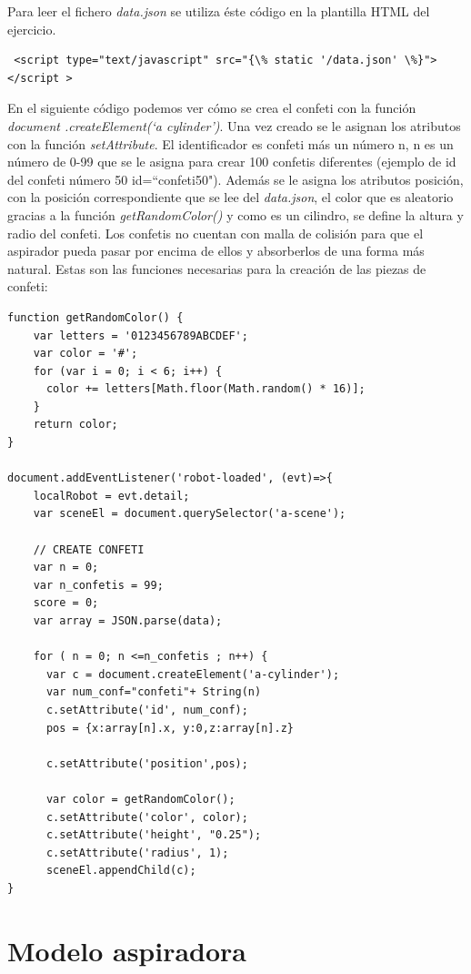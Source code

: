 Para leer el fichero \textit{data.json} se utiliza éste código en la plantilla HTML del ejercicio.
\begin{lstlisting}
 <script type="text/javascript" src="{\% static '/data.json' \%}"></script > 
 \end{lstlisting}


En el siguiente código podemos ver cómo se crea el confeti con la función \textit{document .createElement(`a\- cylinder')}. Una vez creado se le asignan los atributos con la función  \textit{setAttribute}.  El identificador es confeti más un número  n, n es un número de 0-99 que se le asigna para crear 100 confetis diferentes (ejemplo de id del confeti número 50   id=``confeti50"). Además se le asigna los atributos posición, con la posición correspondiente que se lee del \textit{data.json}, el color que es aleatorio gracias a la función \textit{getRandomColor()} y  como es un cilindro, se define la altura y radio del confeti.
Los confetis no cuentan con malla de colisión para que el aspirador pueda pasar por encima de ellos y absorberlos de una forma más natural.
Estas son las funciones necesarias para la creación de las piezas de confeti: 
\begin{lstlisting}
function getRandomColor() {
    var letters = '0123456789ABCDEF';
    var color = '#';
    for (var i = 0; i < 6; i++) {
      color += letters[Math.floor(Math.random() * 16)];
    }
    return color;
}

document.addEventListener('robot-loaded', (evt)=>{
    localRobot = evt.detail;
    var sceneEl = document.querySelector('a-scene');

    // CREATE CONFETI
    var n = 0;
    var n_confetis = 99;
    score = 0;
    var array = JSON.parse(data);

    for ( n = 0; n <=n_confetis ; n++) {
      var c = document.createElement('a-cylinder');
      var num_conf="confeti"+ String(n)
      c.setAttribute('id', num_conf);
      pos = {x:array[n].x, y:0,z:array[n].z}
    
      c.setAttribute('position',pos);
    
      var color = getRandomColor();
      c.setAttribute('color', color);
      c.setAttribute('height', "0.25");
      c.setAttribute('radius', 1);
      sceneEl.appendChild(c);
}
\end{lstlisting}

\section{Modelo aspiradora}

